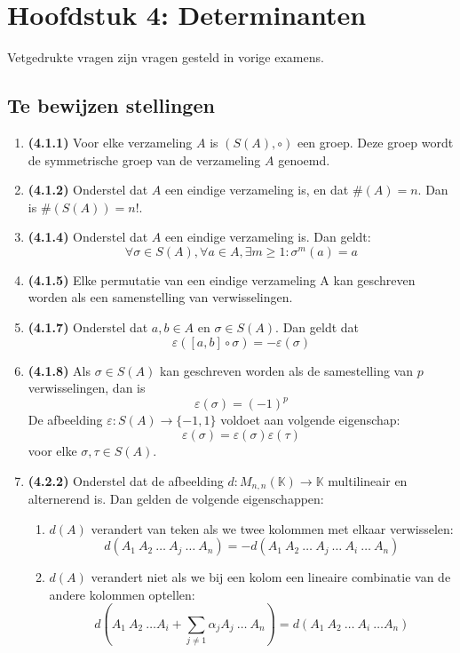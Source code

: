 \documentclass[12pt]{article}
\begin{document}
\date{}    
\maketitle
    \section*{Hoofdstuk 4: Determinanten}
    Vetgedrukte vragen zijn vragen gesteld in vorige examens.
    \setcounter{section}{4}
    \subsection*{Te bewijzen stellingen}
    \begin{enumerate}
        \item \textbf{(4.1.1)} Voor elke verzameling $A$ is $(S(A), \circ)$ een groep. Deze groep wordt de symmetrische groep van de verzameling $A$ genoemd.
        \item \textbf{(4.1.2)} Onderstel dat $A$ een eindige verzameling is, en dat $\#(A)=n$. Dan is $\#(S(A))=n!$.
        \item \textbf{(4.1.4)} Onderstel dat $A$ een eindige verzameling is. Dan geldt: $$\forall \sigma \in S(A), \forall a \in A, \exists m \geq 1: \sigma^m(a)=a$$
        \item \textbf{(4.1.5)} Elke permutatie van een eindige verzameling A kan geschreven worden als een samenstelling van verwisselingen.
        \item \textbf{(4.1.7)} Onderstel dat $a,b \in A$ en $\sigma \in S(A)$. Dan geldt dat $$\varepsilon([a,b]\circ \sigma) = -\varepsilon(\sigma)$$
        \item \textbf{(4.1.8)} Als $\sigma \in S(A)$ kan geschreven worden als de samestelling van $p$ verwisselingen, dan is $$\varepsilon(\sigma)=(-1)^p$$ De afbeelding $\varepsilon:S(A) \rightarrow \{-1,1\}$ voldoet aan volgende eigenschap: $$\varepsilon(\sigma)=\varepsilon(\sigma)\varepsilon(\tau)$$ voor elke $\sigma,\tau \in S(A)$.
        \item \textbf{(4.2.2)} Onderstel dat de afbeelding $d:M_{n,n}(\mathbb{K}) \rightarrow \mathbb{K}$ multilineair en alternerend is. Dan gelden de volgende eigenschappen: \begin{enumerate}
            \item $d(A)$ verandert van teken als we twee kolommen met elkaar verwisselen: $$d(A_1 \ A_2 \ \dots \ A_j \ \dots \ A_n) = -d( A_1 \ A_2 \ \dots \ A_j \ \dots \ A_i \ \dots \ A_n)$$
            \item $d(A)$ verandert niet als we bij een kolom een lineaire combinatie van de andere kolommen optellen: $$d(A_1 \ A_2 \ \dots A_i+\sum_{j\neq 1}\alpha_j A_j \ \dots \ A_n)=d(A_1 \ A_2 \ \dots \ A_i \ \dots A_n)$$

\end{enumerate}
\end{enumerate}
\end{document}

